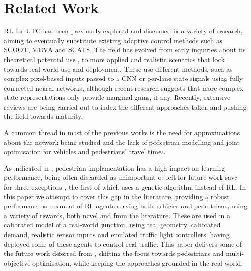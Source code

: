 \documentclass[conference]{IEEEtran}
\begin{document}
\section{Related Work}
\label{lit}
RL for UTC has been previously explored and discussed in a variety of research, aiming to eventually substitute existing adaptive control methods such as SCOOT\cite{scoot}, MOVA\cite{mova} and SCATS\cite{scats}.
The field has evolved from early inquiries about its theoretical potential use \cite{wiering2000} \cite{abdul2003} \cite{pra2010} \cite{abdulhai2010} \cite{abdoos2011}, to more applied and realistic scenarios \cite{survey2014} \cite{genders2016} \cite{liang2017} \cite{gendersthesis} \cite{gao2017} \cite{mousavi2017} \cite{wan2018} \cite{liang2018} \cite{aslani2019} \cite{genders2019} that look towards real-world use and deployment.
These use different methods, such as complex pixel-based inputs passed to a CNN or per-lane state signals using fully connected neural networks, although recent research suggests that more complex state representations only provide marginal gains, if any\cite{gendersstate}.
Recently, extensive reviews are being carried out \cite{mannion} \cite{survey2020} \cite{survey2020wei} to index the different approaches taken and pushing the field towards maturity.

A common thread in most of the previous works is the need for approximations about the network being studied and the lack of pedestrian modelling and joint optimisation for vehicles and pedestrians' travel times.

As indicated in \cite{survey2020}, pedestrian implementation has a high impact on learning performance, being often discarded as unimportant or left for future work save for three exceptions \cite{geneticped} \cite{liu2017} \cite{chen2020}, the first of which uses a genetic algorithm instead of RL.
In this paper we attempt to cover this gap in the literature, providing a robust performance assessment of RL agents serving both vehicles and pedestrians, using a variety of rewards, both novel and from the literature.
These are used in a calibrated model of a real-world junction, using real geometry, calibrated demand, realistic sensor inputs and emulated traffic light controllers, having deployed some of these agents to control real traffic.
This paper delivers some of the future work  deferred from \cite{previous}, shifting the focus towards pedestrians and multi-objective optimisation, while keeping the approaches grounded in the real world.
\end{document}
